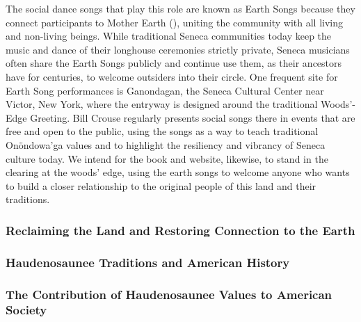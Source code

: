 \documentclass{neh}
\begin{document}
The social dance songs that play this role are known as Earth Songs because
they connect participants to Mother Earth (),
uniting the community with all living and non-living beings.
While traditional Seneca communities today keep the music and dance of their
longhouse ceremonies strictly private, Seneca musicians often share the Earth
Songs publicly and continue use them, as their ancestors have for centuries,
to welcome outsiders into their circle.
One frequent site for Earth Song performances is Ganondagan, the Seneca
Cultural Center near Victor, New York, where the entryway is designed around
the traditional Woods'-Edge Greeting.
Bill Crouse regularly presents social songs there in events that are free and
open to the public, using the songs as a way to teach traditional Onöndowa'ga
values and to highlight the resiliency and vibrancy of Seneca culture today.
We intend for the book and website, likewise, to stand in the clearing at the
woods' edge, using the earth songs to welcome anyone who wants to build a
closer relationship to the original people of this land and their traditions.

\subsubsection{Reclaiming the Land and Restoring Connection to the Earth}

\subsubsection{Haudenosaunee Traditions and American History}

\subsubsection{The Contribution of Haudenosaunee Values to American Society}
\end{document}
